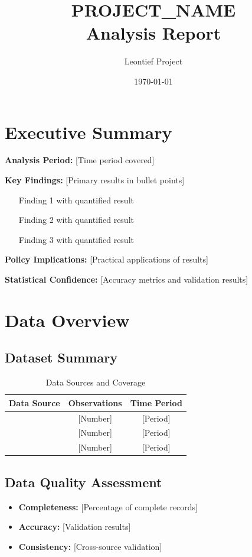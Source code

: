 \documentclass[11pt,letterpaper]{article}
\title{\textbf{PROJECT_NAME}\\Analysis Report}
\author{Leontief Project}
\date{\today}
\begin{document}
\maketitle

\tableofcontents
\newpage

\section{Executive Summary}

\textbf{Analysis Period:} [Time period covered]

\textbf{Key Findings:} [Primary results in bullet points]
\begin{itemize}
    \item [Finding 1 with quantified result]
    \item [Finding 2 with quantified result]
    \item [Finding 3 with quantified result]
\end{itemize}

\textbf{Policy Implications:} [Practical applications of results]

\textbf{Statistical Confidence:} [Accuracy metrics and validation results]

\section{Data Overview}

\subsection{Dataset Summary}
\begin{table}[H]
\centering
\begin{tabular}{@{}lcc@{}}
\toprule
\textbf{Data Source} & \textbf{Observations} & \textbf{Time Period} \\
\midrule
[Source 1] & [Number] & [Period] \\
[Source 2] & [Number] & [Period] \\
[Source 3] & [Number] & [Period] \\
\bottomrule
\end{tabular}
\caption{Data Sources and Coverage}
\end{table}

\subsection{Data Quality Assessment}
\begin{itemize}
    \item \textbf{Completeness:} [Percentage of complete records]
    \item \textbf{Accuracy:} [Validation results]
    \item \textbf{Consistency:} [Cross-source validation]
\end{itemize}
\end{document}
